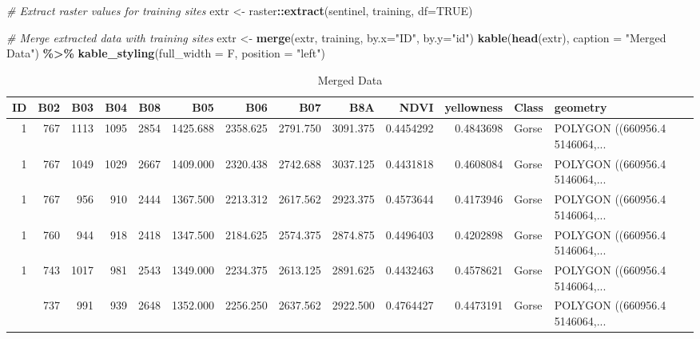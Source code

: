 \documentclass[
]{article}
\newenvironment{Shaded}{\begin{snugshade}}{\end{snugshade}}
\newcommand{\AttributeTok}[1]{\textcolor[rgb]{0.13,0.29,0.53}{#1}}
\newcommand{\CommentTok}[1]{\textcolor[rgb]{0.56,0.35,0.01}{\textit{#1}}}
\newcommand{\ConstantTok}[1]{\textcolor[rgb]{0.56,0.35,0.01}{#1}}
\newcommand{\FunctionTok}[1]{\textcolor[rgb]{0.13,0.29,0.53}{\textbf{#1}}}
\newcommand{\NormalTok}[1]{#1}
\newcommand{\OtherTok}[1]{\textcolor[rgb]{0.56,0.35,0.01}{#1}}
\newcommand{\SpecialCharTok}[1]{\textcolor[rgb]{0.81,0.36,0.00}{\textbf{#1}}}
\newcommand{\StringTok}[1]{\textcolor[rgb]{0.31,0.60,0.02}{#1}}
\begin{document}
\begin{Shaded}
\begin{Highlighting}[]
\CommentTok{\# Extract raster values for training sites}
\NormalTok{extr }\OtherTok{\textless{}{-}}\NormalTok{ raster}\SpecialCharTok{::}\FunctionTok{extract}\NormalTok{(sentinel, training, }\AttributeTok{df=}\ConstantTok{TRUE}\NormalTok{)}

\CommentTok{\# Merge extracted data with training sites}
\NormalTok{extr }\OtherTok{\textless{}{-}} \FunctionTok{merge}\NormalTok{(extr, training, }\AttributeTok{by.x=}\StringTok{"ID"}\NormalTok{, }\AttributeTok{by.y=}\StringTok{"id"}\NormalTok{)}
\FunctionTok{kable}\NormalTok{(}\FunctionTok{head}\NormalTok{(extr), }\AttributeTok{caption =} \StringTok{"Merged Data"}\NormalTok{) }\SpecialCharTok{\%\textgreater{}\%}
  \FunctionTok{kable\_styling}\NormalTok{(}\AttributeTok{full\_width =}\NormalTok{ F, }\AttributeTok{position =} \StringTok{"left"}\NormalTok{)}
\end{Highlighting}
\end{Shaded}

\begin{longtable}[l]{rrrrrrrrrrrll}
\caption{\label{tab:extract}Merged Data}\\
\toprule
ID & B02 & B03 & B04 & B08 & B05 & B06 & B07 & B8A & NDVI & yellowness & Class & geometry\\
\midrule
1 & 767 & 1113 & 1095 & 2854 & 1425.688 & 2358.625 & 2791.750 & 3091.375 & 0.4454292 & 0.4843698 & Gorse & POLYGON ((660956.4 5146064,...\\
1 & 767 & 1049 & 1029 & 2667 & 1409.000 & 2320.438 & 2742.688 & 3037.125 & 0.4431818 & 0.4608084 & Gorse & POLYGON ((660956.4 5146064,...\\
1 & 767 & 956 & 910 & 2444 & 1367.500 & 2213.312 & 2617.562 & 2923.375 & 0.4573644 & 0.4173946 & Gorse & POLYGON ((660956.4 5146064,...\\
1 & 760 & 944 & 918 & 2418 & 1347.500 & 2184.625 & 2574.375 & 2874.875 & 0.4496403 & 0.4202898 & Gorse & POLYGON ((660956.4 5146064,...\\
1 & 743 & 1017 & 981 & 2543 & 1349.000 & 2234.375 & 2613.125 & 2891.625 & 0.4432463 & 0.4578621 & Gorse & POLYGON ((660956.4 5146064,...\\
\addlinespace
1 & 737 & 991 & 939 & 2648 & 1352.000 & 2256.250 & 2637.562 & 2922.500 & 0.4764427 & 0.4473191 & Gorse & POLYGON ((660956.4 5146064,...\\
\bottomrule
\end{longtable}
\end{document}
